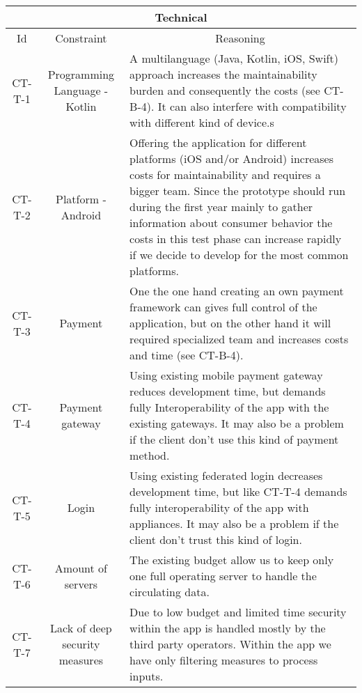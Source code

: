 \begin{table}[H]
    \begin{tabularx}{\textwidth}{|c|c|X|}
        \hline
        \multicolumn{3}{c}{\textbf{Technical}} \\
        \hline
        \toprule
        \multicolumn{1}{c}{Id} & \multicolumn{1}{c}{Constraint} & \multicolumn{1}{c}{Reasoning} \\
        \midrule
        CT-T-1 & Programming Language - Kotlin & A multilanguage (Java, Kotlin, iOS, Swift) approach increases
        the maintainability burden and consequently the costs (see CT-B-4). It can also interfere with
        compatibility with different kind of device.s  \\ 
        CT-T-2 & Platform - Android & Offering the application for different platforms (iOS and/or Android) increases
        costs for maintainability and requires a bigger team. Since the prototype should run during the
        first year mainly to gather information about consumer behavior the costs in this test phase can
        increase rapidly if we decide to develop for the most common platforms. \\ 
        CT-T-3 & Payment & One the one hand creating an own payment framework can gives full control of the application,
        but on the other hand it will required specialized team and increases costs and time (see CT-B-4). \\
        CT-T-4 & Payment gateway & Using existing \gls{mobile payment gateway} reduces development time, but demands
        fully Interoperability of the app with the existing gateways. It may also be a problem if the \gls{client}
        don't use this kind of payment method. \\
        CT-T-5 & Login & Using existing \gls{federated login} decreases development time, but like CT-T-4 demands
        fully interoperability of the app with appliances. It may also be a problem if the \gls{client}
        don't trust this kind of login. \\
        CT-T-6 & Amount of servers & The existing budget allow us to keep only one full operating server to handle
        the circulating data. \\
        CT-T-7 & Lack of deep security measures & Due to low budget and limited time security within the app is handled 
        mostly by the third party operators. Within the app we have only filtering measures to process inputs. \\
        \bottomrule
    \end{tabularx}
\end{table}

